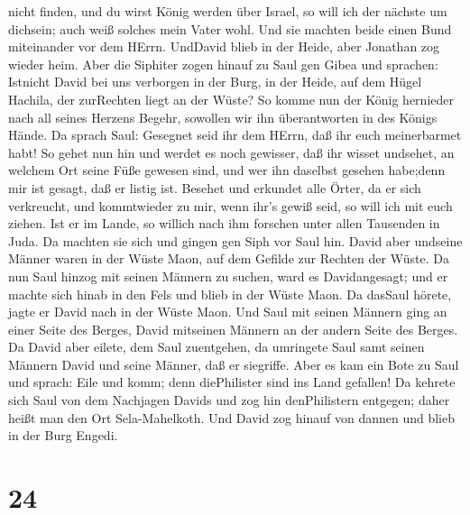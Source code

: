 nicht finden, und du wirst König werden über Israel, so will ich der
nächste um dichsein; auch weiß solches mein Vater wohl. 
Und sie machten beide einen Bund miteinander vor dem HErrn. UndDavid
blieb in der Heide, aber Jonathan zog wieder heim.  Aber
die Siphiter zogen hinauf zu Saul gen Gibea und sprachen: Istnicht David
bei uns verborgen in der Burg, in der Heide, auf dem Hügel Hachila, der
zurRechten liegt an der Wüste?  So komme nun der König
hernieder nach all seines Herzens Begehr, sowollen wir ihn überantworten
in des Königs Hände.  Da sprach Saul: Gesegnet seid ihr dem
HErrn, daß ihr euch meinerbarmet habt!  So gehet nun hin
und werdet es noch gewisser, daß ihr wisset undsehet, an welchem Ort
seine Füße gewesen sind, und wer ihn daselbst gesehen habe;denn mir ist
gesagt, daß er listig ist.  Besehet und erkundet alle
Örter, da er sich verkreucht, und kommtwieder zu mir, wenn ihr's gewiß
seid, so will ich mit euch ziehen. Ist er im Lande, so willich nach ihm
forschen unter allen Tausenden in Juda.  Da machten sie
sich und gingen gen Siph vor Saul hin. David aber undseine Männer waren
in der Wüste Maon, auf dem Gefilde zur Rechten der Wüste. 
Da nun Saul hinzog mit seinen Männern zu suchen, ward es Davidangesagt;
und er machte sich hinab in den Fels und blieb in der Wüste Maon. Da
dasSaul hörete, jagte er David nach in der Wüste Maon.  Und
Saul mit seinen Männern ging an einer Seite des Berges, David mitseinen
Männern an der andern Seite des Berges. Da David aber eilete, dem Saul
zuentgehen, da umringete Saul samt seinen Männern David und seine
Männer, daß er siegriffe.  Aber es kam ein Bote zu Saul und
sprach: Eile und komm; denn diePhilister sind ins Land gefallen!
 Da kehrete sich Saul von dem Nachjagen Davids und zog hin
denPhilistern entgegen; daher heißt man den Ort Sela-Mahelkoth.
 Und David zog hinauf von dannen und blieb in der Burg
Engedi.

\hypertarget{section-23}{%
\section{24}\label{section-23}}

